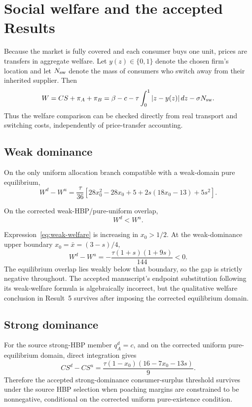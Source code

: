 \section{Social welfare and the accepted Results}
\label{sec:welfare}

Because the market is fully covered and each consumer buys one unit, prices are transfers in aggregate welfare. Let \(y(z)\in\{0,1\}\) denote the chosen firm's location and let \(N_{\rm sw}\) denote the mass of consumers who switch away from their inherited supplier. Then
\begin{equation}
W=CS+\pi_A+\pi_B
=
\beta-c
-\tau\int_0^1 |z-y(z)|\,dz
-\sigma N_{\rm sw}.
\label{eq:welfare-resource}
\end{equation}
Thus the welfare comparison can be checked directly from real transport and switching costs, independently of price-transfer accounting.

\subsection{Weak dominance}

On the only uniform allocation branch compatible with a weak-domain pure equilibrium,
\begin{equation}
W^d-W^u
=
\frac{\tau}{36}
\left[
28x_0^2-28x_0+5
+2s(18x_0-13)+5s^2
\right].
\label{eq:weak-welfare}
\end{equation}

\begin{proposition}
\label{prop:weak-welfare}
On the corrected weak-HBP/pure-uniform overlap,
\[
W^d<W^u.
\]
\end{proposition}

Expression~\eqref{eq:weak-welfare} is increasing in \(x_0>1/2\). At the weak-dominance upper boundary \(x_0=\bar x=(3-s)/4\),
\[
W^d-W^u
=
-\frac{\tau(1+s)(1+9s)}{144}<0.
\]
The equilibrium overlap lies weakly below that boundary, so the gap is strictly negative throughout. The accepted manuscript's endpoint substitution following its weak-welfare formula is algebraically incorrect, but the qualitative welfare conclusion in Result~5 survives after imposing the corrected equilibrium domain.

\subsection{Strong dominance}

For the source strong-HBP member \(q_A^d=c\), and on the corrected uniform pure-equilibrium domain, direct integration gives
\begin{equation}
CS^d-CS^u
=
\frac{\tau(1-x_0)(16-7x_0-13s)}9.
\label{eq:strong-cs}
\end{equation}
Therefore the accepted strong-dominance consumer-surplus threshold survives under the source HBP selection when poaching margins are constrained to be nonnegative, conditional on the corrected uniform pure-existence condition.

